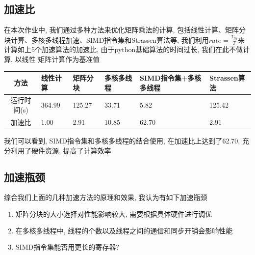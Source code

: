 \documentclass[11pt]{article}
\begin{document}
\subsection{加速比}
在本次作业中, 我们通过多种方法来优化矩阵乘法的计算, 包括线性计算、矩阵分块计算、多核多线程加速、SIMD指令集和Strassen算法等,
我们利用$rate = \frac{T_{py}}{T}$来计算如上5个加速算法的加速比, 由于python基础算法的时间过长, 我们在此不做计算, 以线性
矩阵计算作为基准值
\begin{table}[H]
    \centering
    \begin{tabular}{|c|C{2cm}|C{2cm}|C{2cm}|C{2cm}|C{2.4cm}|}\hline
        方法 & 线性计算 & 矩阵分块 & 多核多线程 & SIMD指令集+多核多线程 & Strassen算法 \\\hline
        运行时间(s) & 364.99 & 125.27 & 33.71 & 5.82 & 125.42 \\\hline
        加速比 & 1.00 & 2.91 & 10.85 & 62.70 & 2.91 \\\hline
    \end{tabular}
\end{table}
我们可以看到, SIMD指令集和多核多线程的结合使用, 在加速比上达到了62.70, 充分利用了硬件资源, 提高了计算效率.
\subsection{加速瓶颈}
综合我们上面的几种加速方法的原理和效果, 我认为有如下加速瓶颈
\begin{enumerate}
  \item 矩阵分块的大小选择对性能影响较大, 需要根据具体硬件进行调优
  \item 在多核多线程中, 线程的个数以及线程之间的通信和同步开销会影响性能
  \item SIMD指令集能否用更长的寄存器?
\end{enumerate}
\end{document}

